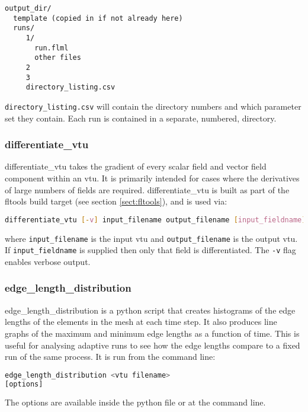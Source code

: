 \begin{lstlisting}
output_dir/
  template (copied in if not already here)
  runs/
     1/
       run.flml
       other files
     2
     3
     directory_listing.csv
\end{lstlisting}

\lstinline[language = Bash]+directory_listing.csv+ will contain the directory numbers and which parameter set they contain. Each run is contained in a separate, numbered, directory.


\subsubsection{differentiate\_vtu}
\label{sect:differentiate_vtu}

differentiate\_vtu takes the gradient of every scalar field and vector field
component within an vtu. It is primarily intended for cases where the derivatives
of large numbers of fields are required. differentiate\_vtu is built as part of the fltools
build target (see section \ref{sect:fltools}), and is used via:

\begin{lstlisting}[language = Bash]
differentiate_vtu [-v] input_filename output_filename [input_fieldname]
\end{lstlisting}

where \lstinline[language = Bash]+input_filename+ is the input vtu and
\lstinline[language = Bash]+output_filename+ is the output vtu. If
\lstinline[language = Bash]+input_fieldname+ is supplied then only that field
is differentiated. The \lstinline[language = Bash]+-v+ flag enables verbose output.


\subsubsection{edge\_length\_distribution}
\label{sect:edgelengthdist}

edge\_length\_distribution is a python script that creates histograms of the edge lengths of the elements in the mesh at each time step. It also produces line graphs of the maximum and minimum edge lengths as a function of time. This is useful for analysing adaptive runs to see how the edge lengths compare to a fixed run of the same process.  It is run from the command line:
\begin{lstlisting}[language = Bash]
edge_length_distribution <vtu filename> 
[options]
\end{lstlisting}
The options are available inside the python file or at the command line.

